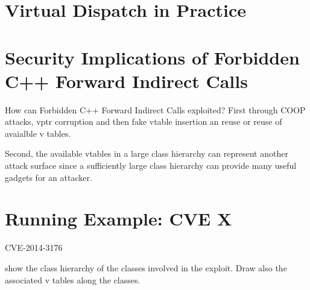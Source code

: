 \section{Virtual Dispatch in Practice}
\label{Virtual Dispatch in Practice}

\section{Security Implications of Forbidden C++ Forward Indirect Calls}
\label{Security Implications of Virtual Dispatch}

How can Forbidden C++ Forward Indirect Calls exploited?
First through COOP attacks,
vptr corruption and then fake vtable insertion an reuse
or reuse of avaialble v tables.

Second, the available vtables in a large class hierarchy can represent 
another attack surface since a sufficiently large class hierarchy can provide
many useful gadgets for an attacker.

\section{Running Example: CVE X}
\label{Running Example: CVE X}
CVE-2014-3176


show the class hierarchy of the classes involved in the exploit.
Draw also the associated v tables along the classes.







